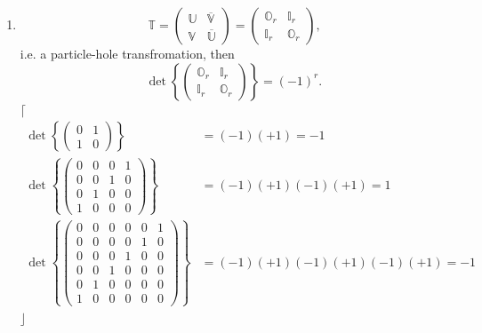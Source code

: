 \documentclass[aps, preprint]{revtex4}
\begin{document}
\begin{enumerate}
\item
\begin{equation}\mathbb{T} =\left (\begin{array}{cc}\mathbb{U} & \overline{\mathbb{V}} \\
\mathbb{V} & \overline{\mathbb{U}}\end{array}\right ) =\left (\begin{array}{cc}\mathbb{O}_{r} & \mathbb{I}_{r} \\
\mathbb{I}_{r} & \mathbb{O}_{r}\end{array}\right )\text{,}
\end{equation}i.e. a particle-hole transfromation, then
\begin{equation}\det \left \{\left (\begin{array}{cc}\mathbb{O}_{r} & \mathbb{I}_{r} \\
\mathbb{I}_{r} & \mathbb{O}_{r}\end{array}\right )\right \} =\left ( -1\right )^{r}\text{.}
\end{equation}$\lceil $
\begin{align}\det \left \{\left (\begin{array}{cc}0 & 1 \\
1 & 0\end{array}\right )\right \} &  =\left ( -1\right ) \left ( +1\right ) = -1 \\
\det \left \{\left (\begin{array}{cccc}0 & 0 & 0 & 1 \\
0 & 0 & 1 & 0 \\
0 & 1 & 0 & 0 \\
1 & 0 & 0 & 0\end{array}\right )\right \} &  =\left ( -1\right ) \left ( +1\right ) \left ( -1\right ) \left ( +1\right ) =1 \\
\det \left \{\left (\begin{array}{cccccc}0 & 0 & 0 & 0 & 0 & 1 \\
0 & 0 & 0 & 0 & 1 & 0 \\
0 & 0 & 0 & 1 & 0 & 0 \\
0 & 0 & 1 & 0 & 0 & 0 \\
0 & 1 & 0 & 0 & 0 & 0 \\
1 & 0 & 0 & 0 & 0 & 0\end{array}\right )\right \} &  =\left ( -1\right ) \left ( +1\right ) \left ( -1\right ) \left ( +1\right ) \left ( -1\right ) \left ( +1\right ) = -1\end{align}$\rfloor $ 


\end{enumerate}
\end{document}
